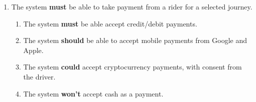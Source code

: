\documentclass{article}
\begin{document}
\begin{enumerate}
      \vspace{.5cm}
      \item The system \textbf{must} be able to take payment from a rider for a selected journey.
      \begin{enumerate}[label=2.\arabic*]
        \item The system \textbf{must} be able accept credit/debit payments.
        \item The system \textbf{should} be able to accept mobile payments from Google and Apple.
        \item The system \textbf{could} accept cryptocurrency payments, with consent from the driver.
        \item The system \textbf{won't} accept cash as a payment.
      \end{enumerate}


\end{enumerate}
\end{document}
